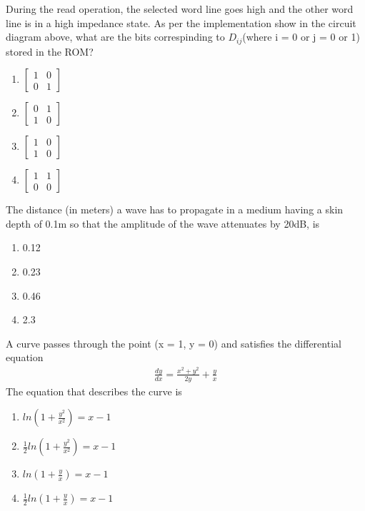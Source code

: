 During the read operation, the selected word line goes high and the other word line is in a high impedance state. As per the implementation show in the circuit diagram above, what are the bits correspinding to $D_{ij}$(where i = 0 or j = 0 or 1) stored in the ROM?
\begin{enumerate}
\item $\begin{bmatrix}
1 & 0 \\ 0 & 1
\end{bmatrix}$
\item $\begin{bmatrix}
0 & 1 \\ 1 & 0
\end{bmatrix}$
\item $\begin{bmatrix}
1 & 0 \\ 1 & 0
\end{bmatrix}$
\item $\begin{bmatrix}
1 & 1 \\ 0 & 0
\end{bmatrix}$
\end{enumerate}

\item The distance (in meters) a wave has to propagate in a medium having a skin depth of 0.1m so that the amplitude of the wave attenuates by 20dB, is
\begin{enumerate}
\item 0.12
\item 0.23
\item 0.46
\item 2.3
\end{enumerate}

\item A curve passes through the point (x = 1, y = 0) and satisfies the differential equation
\begin{align*}
\frac{dy}{dx} = \frac{x^2 + y^2}{2y} + \frac{y}{x}
\end{align*}
The equation that describes the curve is
\begin{enumerate}
\item $ln\left(1 + \frac{y^2}{x^2}\right) = x - 1$
\item $\frac{1}{2} ln\left(1 + \frac{y^2}{x^2}\right) = x - 1$
\item $ln\left(1 + \frac{y}{x}\right) = x - 1$
\item $\frac{1}{2} ln\left(1 + \frac{y}{x}\right) = x - 1$
\end{enumerate}

